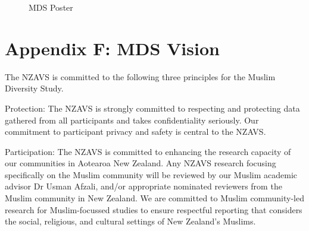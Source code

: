\documentclass[
]{interact}
\begin{document}
\begin{figure}


\caption{\label{fig-appendfig1}MDS Poster}

\end{figure}%

\newpage{}

\section{Appendix F: MDS Vision}\label{appendix-f-mds-vision}

The NZAVS is committed to the following three principles for the Muslim
Diversity Study.

\noindent Protection: The NZAVS is strongly committed to respecting and
protecting data gathered from all participants and takes confidentiality
seriously. Our commitment to participant privacy and safety is central
to the NZAVS.

\noindent Participation: The NZAVS is committed to enhancing the
research capacity of our communities in Aotearoa New Zealand. Any NZAVS
research focusing specifically on the Muslim community will be reviewed
by our Muslim academic advisor Dr Usman Afzali, and/or appropriate
nominated reviewers from the Muslim community in New Zealand. We are
committed to Muslim community-led research for Muslim-focussed studies
to ensure respectful reporting that considers the social, religious, and
cultural settings of New Zealand's Muslims.
\end{document}
